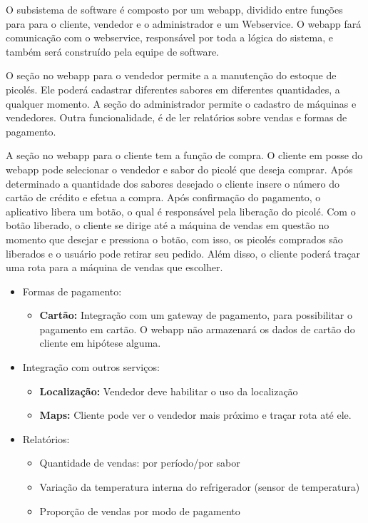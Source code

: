 O subsistema de software é composto por um  webapp, dividido entre funções para para o cliente, vendedor e o administrador e um Webservice. O webapp fará comunicação com o webservice, responsável por toda a lógica do sistema, e também será construído pela equipe de software.

	O seção no webapp para o vendedor permite a a manutenção do estoque de picolés. Ele poderá cadastrar diferentes sabores em diferentes quantidades, a qualquer momento. 
    A seção do administrador permite o cadastro de máquinas e vendedores.
    Outra funcionalidade, é de ler relatórios sobre vendas e formas de pagamento.
    
    A seção no webapp para o cliente tem a função de compra. O cliente em posse do webapp pode selecionar o vendedor e sabor do picolé que deseja comprar. Após determinado a quantidade dos sabores desejado o cliente insere o número do cartão de crédito e efetua a compra. Após confirmação do pagamento, o aplicativo libera um botão, o qual é responsável pela liberação do picolé. Com o botão liberado, o cliente se dirige até a máquina de vendas em questão no momento que desejar e pressiona o botão, com isso, os picolés comprados são liberados e o usuário pode retirar seu pedido. Além disso, o cliente poderá traçar uma rota para a máquina de vendas que escolher.

\begin{itemize}
	\item Formas de pagamento:
    \begin{itemize}
        \item \textbf{Cartão:} Integração com um gateway de pagamento, para possibilitar o pagamento em cartão. O webapp não armazenará os dados de cartão do cliente em hipótese alguma.
  	\end{itemize}

	\item Integração com outros serviços:
  	\begin{itemize}
    	\item \textbf{Localização:} Vendedor deve habilitar o uso da localização
    	\item \textbf{Maps:} Cliente pode ver o vendedor mais próximo e traçar rota até ele.
  	\end{itemize}

	\item Relatórios:
  	\begin{itemize}
        \item Quantidade de vendas: por período/por sabor
        \item Variação da temperatura interna do refrigerador (sensor de temperatura)
        \item Proporção de vendas por modo de pagamento
  	\end{itemize}
\end{itemize}


